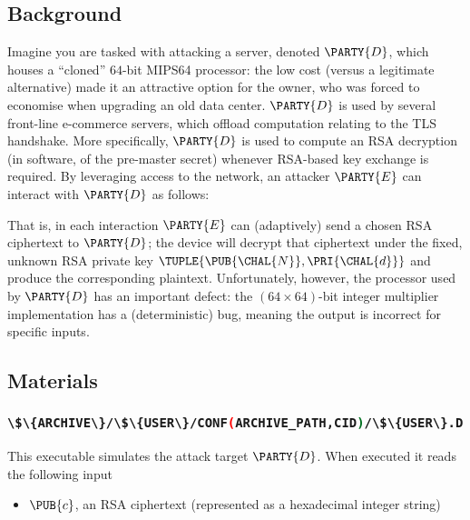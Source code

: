 \documentclass[crop={false},multi={true},tikz={true}]{standalone}
\begin{document}

\subsection{Background}

Imagine you are tasked with attacking a server, denoted $\PARTY{D}$, 
which houses a ``cloned'' $64$-bit MIPS64 processor: the low cost (versus a 
legitimate alternative) made it an attractive option for the owner, who was
forced to economise when upgrading an old data center.
$\PARTY{D}$ is used by several front-line e-commerce servers, which offload
computation relating to the TLS handshake.  More specifically, $\PARTY{D}$ 
is used to compute an RSA decryption (in software, of the pre-master secret)
whenever RSA-based key exchange is required.
By leveraging access to the network, 
an attacker $\PARTY{E}$ can interact with $\PARTY{D}$ as follows:

\begin{center}

\end{center}

\noindent
That is, in each interaction $\PARTY{E}$ can (adaptively) send 
a chosen RSA ciphertext
to $\PARTY{D}$; the device will
decrypt that ciphertext under the fixed, unknown RSA private key $\TUPLE{ \PUB{\CHAL{N}}, \PRI{\CHAL{d}} }$ 
and produce 
the corresponding  plaintext.
Unfortunately, however, the processor used by $\PARTY{D}$ has an important
defect: the $( 64 \times 64 )$-bit integer multiplier implementation has a
(deterministic) bug, meaning the output is incorrect for specific inputs.

\subsection{Materials}

\subsubsection{\lstinline[language={bash}]|\$\{ARCHIVE\}/\$\{USER\}/CONF(ARCHIVE_PATH,CID)/\$\{USER\}.D|}

This executable simulates the attack target $\PARTY{D}$.  When executed it 
reads the following input

\begin{itemize}
\item $\PUB{c}$,
      an RSA ciphertext
      (represented as a  hexadecimal integer string)
\end{itemize}
\end{document}
